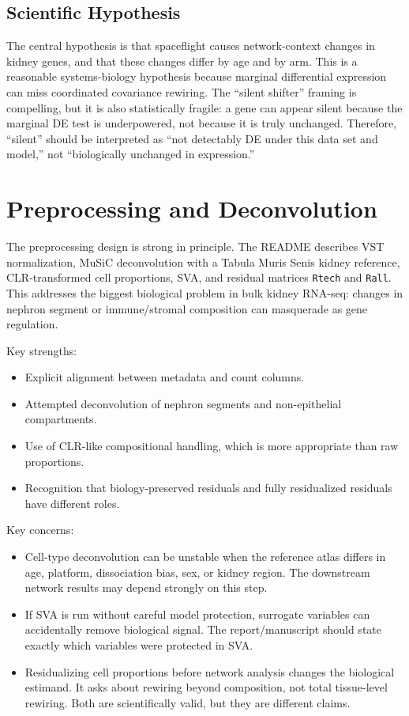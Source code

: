 \documentclass[11pt]{article}
\begin{document}
\subsection{Scientific Hypothesis}

The central hypothesis is that spaceflight causes network-context changes in kidney genes, and that these changes differ by age and by arm.  This is a reasonable systems-biology hypothesis because marginal differential expression can miss coordinated covariance rewiring.  The ``silent shifter'' framing is compelling, but it is also statistically fragile: a gene can appear silent because the marginal DE test is underpowered, not because it is truly unchanged.  Therefore, ``silent'' should be interpreted as ``not detectably DE under this data set and model,'' not ``biologically unchanged in expression.''

\section{Preprocessing and Deconvolution}

The preprocessing design is strong in principle.  The README describes VST normalization, MuSiC deconvolution with a Tabula Muris Senis kidney reference, CLR-transformed cell proportions, SVA, and residual matrices \texttt{Rtech} and \texttt{Rall}.  This addresses the biggest biological problem in bulk kidney RNA-seq: changes in nephron segment or immune/stromal composition can masquerade as gene regulation.

Key strengths:
\begin{itemize}[leftmargin=1.5em]
    \item Explicit alignment between metadata and count columns.
    \item Attempted deconvolution of nephron segments and non-epithelial compartments.
    \item Use of CLR-like compositional handling, which is more appropriate than raw proportions.
    \item Recognition that biology-preserved residuals and fully residualized residuals have different roles.
\end{itemize}

Key concerns:
\begin{itemize}[leftmargin=1.5em]
    \item Cell-type deconvolution can be unstable when the reference atlas differs in age, platform, dissociation bias, sex, or kidney region.  The downstream network results may depend strongly on this step.
    \item If SVA is run without careful model protection, surrogate variables can accidentally remove biological signal.  The report/manuscript should state exactly which variables were protected in SVA.
    \item Residualizing cell proportions before network analysis changes the biological estimand.  It asks about rewiring beyond composition, not total tissue-level rewiring.  Both are scientifically valid, but they are different claims.
\end{itemize}
\end{document}
